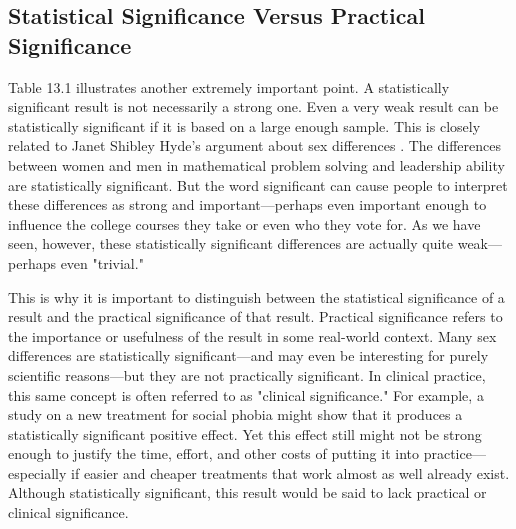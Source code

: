\subsection{Statistical Significance Versus Practical Significance}


Table 13.1 illustrates another extremely important point. A statistically significant result is not necessarily a strong one. Even a very weak result can be statistically significant if it is based on a large enough sample. This is closely related to Janet Shibley Hyde's argument about sex differences \citep{hyde_new_2007}. The differences between women and men in mathematical problem solving and leadership ability are statistically significant. But the word significant can cause people to interpret these differences as strong and important---perhaps even important enough to influence the college courses they take or even who they vote for. As we have seen, however, these statistically significant differences are actually quite weak---perhaps even "trivial."


This is why it is important to distinguish between the statistical significance of a result and the practical significance of that result. Practical significance refers to the importance or usefulness of the result in some real-world context. Many sex differences are statistically significant---and may even be interesting for purely scientific reasons---but they are not practically significant. In clinical practice, this same concept is often referred to as "clinical significance." For example, a study on a new treatment for social phobia might show that it produces a statistically significant positive effect. Yet this effect still might not be strong enough to justify the time, effort, and other costs of putting it into practice---especially if easier and cheaper treatments that work almost as well already exist. Although statistically significant, this result would be said to lack practical or clinical significance.


